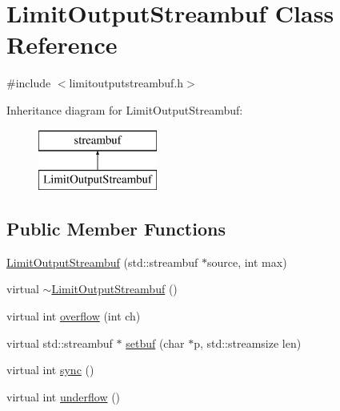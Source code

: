 \hypertarget{classstanfordcpplib_1_1LimitOutputStreambuf}{}\section{Limit\+Output\+Streambuf Class Reference}
\label{classstanfordcpplib_1_1LimitOutputStreambuf}


{\ttfamily \#include $<$limitoutputstreambuf.\+h$>$}

Inheritance diagram for Limit\+Output\+Streambuf\+:\begin{figure}[H]
\begin{center}
\leavevmode
\includegraphics[height=2.000000cm]{classstanfordcpplib_1_1LimitOutputStreambuf}
\end{center}
\end{figure}
\subsection*{Public Member Functions}
\begin{DoxyCompactItemize}
\item 
\mbox{\hyperlink{classstanfordcpplib_1_1LimitOutputStreambuf_a88e3d8af07f713f8ffea0137187b0947}{Limit\+Output\+Streambuf}} (std\+::streambuf $\ast$source, int max)
\item 
virtual \mbox{\hyperlink{classstanfordcpplib_1_1LimitOutputStreambuf_a76e257edd7042a84c736e849c75d2968}{$\sim$\+Limit\+Output\+Streambuf}} ()
\item 
virtual int \mbox{\hyperlink{classstanfordcpplib_1_1LimitOutputStreambuf_ad22b2b86c11a461dcf2680fd4806dc6e}{overflow}} (int ch)
\item 
virtual std\+::streambuf $\ast$ \mbox{\hyperlink{classstanfordcpplib_1_1LimitOutputStreambuf_adab87f356f20a3d6ac970facd081f967}{setbuf}} (char $\ast$p, std\+::streamsize len)
\item 
virtual int \mbox{\hyperlink{classstanfordcpplib_1_1LimitOutputStreambuf_a810a727ce5554d3178e17b6bc55025dd}{sync}} ()
\item 
virtual int \mbox{\hyperlink{classstanfordcpplib_1_1LimitOutputStreambuf_aeb6918bd44153b257e097e2d2ef370ef}{underflow}} ()
\end{DoxyCompactItemize}


